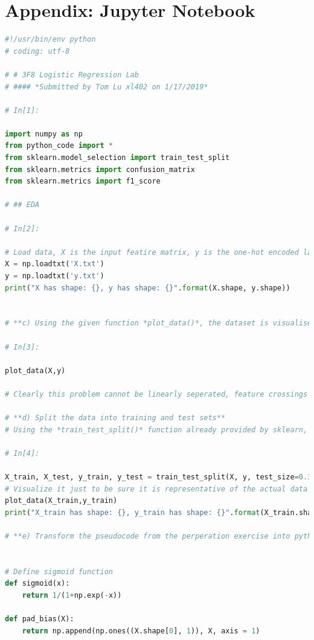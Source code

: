 \documentclass[journal]{IEEEtran}
\begin{document}
\section{Appendix: Jupyter Notebook}
\begin{lstlisting}[language=Python]
#!/usr/bin/env python
# coding: utf-8

# # 3F8 Logistic Regression Lab
# #### *Submitted by Tom Lu xl402 on 1/17/2019*

# In[1]:

import numpy as np
from python_code import *
from sklearn.model_selection import train_test_split
from sklearn.metrics import confusion_matrix
from sklearn.metrics import f1_score

# ## EDA

# In[2]:

# Load data, X is the input featire matrix, y is the one-hot encoded label
X = np.loadtxt('X.txt')
y = np.loadtxt('y.txt')
print("X has shape: {}, y has shape: {}".format(X.shape, y.shape))


# **c) Using the given function *plot_data()*, the dataset is visualised in the two dimensional input space displaying each datapoint's class label**

# In[3]:

plot_data(X,y)

# Clearly this problem cannot be linearly seperated, feature crossings should be used (later on) to improve classification accuracy

# **d) Split the data into training and test sets**
# Using the *train_test_split()* function already provided by sklearn, with a fixed random seed to make the results reproducable each time, the test/train dataset ratio is set to be 33% V 67%, this is because our dataset is sufficiently large

# In[4]:

X_train, X_test, y_train, y_test = train_test_split(X, y, test_size=0.33, random_state=69)
# Visualize it just to be sure it is representative of the actual data set
plot_data(X_train,y_train)
print("X_train has shape: {}, y_train has shape: {}".format(X_train.shape, y_train.shape))

# **e) Transform the pseudocode from the perperation exercise into python code**


# Define sigmoid function
def sigmoid(x):
    return 1/(1+np.exp(-x))

def pad_bias(X):
    return np.append(np.ones((X.shape[0], 1)), X, axis = 1)


\end{lstlisting}
\end{document}
